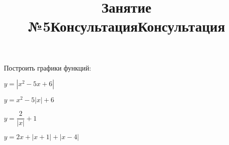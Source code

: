 %
\newpage
\title{Занятие №5}
\begin{listofex}
	\item {}
	\item {}
	\item {}
	\item {}
	\item {}
	\item {}
	\item {}
	\item {}
	\item {}
	\item {}
	\item {}
	\item Построить графики функций:
	\begin{enumcols}[itemcolumns=2]
		\item \( y=|x^2-5x+6| \)
		\item \( y=x^2-5|x|+6 \)
		\item \( y=\dfrac{2}{|x|}+1 \)
		\item \( y=2x+|x+1|+|x-4| \)
	\end{enumcols}
\end{listofex}
%
%
%
\newpage
\title{Консультация}
\begin{listofex}
	\item {}
	\item {}
	\item {}
	\item {}
	\item {}
	\item {}
\end{listofex}
\newpage
\title{Консультация}
